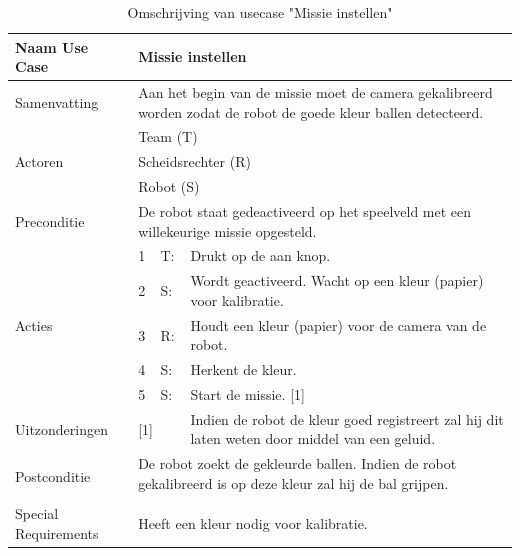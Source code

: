\documentclass[12pt]{article} %
\begin{document}
\begin{landscape}
\begin{table}[htbp]
  \centering
    \begin{tabular}{llll}
    \toprule
    Naam Use Case & \multicolumn{3}{l}{\textbf{Missie instellen}} \\
    \midrule
    Samenvatting & \multicolumn{3}{l}{Aan het begin van de missie moet de camera gekalibreerd worden zodat de robot de goede kleur ballen detecteerd.} \\
    \multirow{3}[1]{*}{Actoren} & \multicolumn{3}{l}{Team (T)} \\
          & \multicolumn{3}{l}{Scheidsrechter (R)} \\
          & \multicolumn{3}{l}{Robot (S)} \\
    Preconditie & \multicolumn{3}{l}{De robot staat gedeactiveerd op het speelveld met een willekeurige missie opgesteld.} \\
    \multirow{5}[9]{*}{Acties} & 1     & T:    & Drukt op de aan knop. \\
          & 2     & S:    & Wordt geactiveerd. Wacht op een kleur (papier) voor kalibratie. \\
          & 3     & R:    & Houdt een kleur (papier) voor de camera van de robot. \\
          & 4     & S:    & Herkent de kleur. \\
          & 5     & S:    & Start de missie. [1] \\
    Uitzonderingen & \multicolumn{2}{l}{[1]} & Indien de robot de kleur goed registreert zal hij dit laten weten door middel van een geluid. \\
    \multirow{2}[1]{*}{Postconditie} & \multicolumn{3}{l}{De robot zoekt de gekleurde ballen. Indien de robot gekalibreerd is op deze kleur zal hij de bal grijpen.} \\
          & \multicolumn{3}{l}{} \\
    Special Requirements  & \multicolumn{3}{l}{Heeft een kleur nodig voor kalibratie.} \\
    \bottomrule
    \end{tabular}%
  \caption{Omschrijving van usecase "Missie instellen"}
  \label{tab:addlabel2}%
\end{table}%
\clearpage


\end{landscape}
\end{document}
